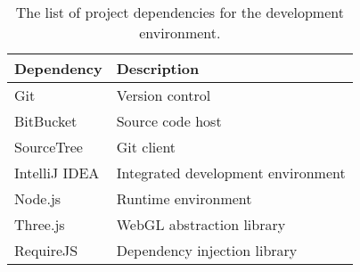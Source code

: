\begin{table}[H]
\caption[Development environment]{The list of project dependencies for the development environment.}
\label{tab:development_environment}
\begin{tabularx}{\textwidth}{@{}XX@{}}
	\toprule
	\textbf{Dependency} & \textbf{Description} \\
	\midrule
	Git & Version control \\
	BitBucket & Source code host \\
	SourceTree & Git client \\
	IntelliJ IDEA & Integrated development environment \\
	Node.js & Runtime environment \\
	Three.js & WebGL abstraction library \\
	RequireJS & Dependency injection library \\
	\bottomrule
\end{tabularx}
\end{table}